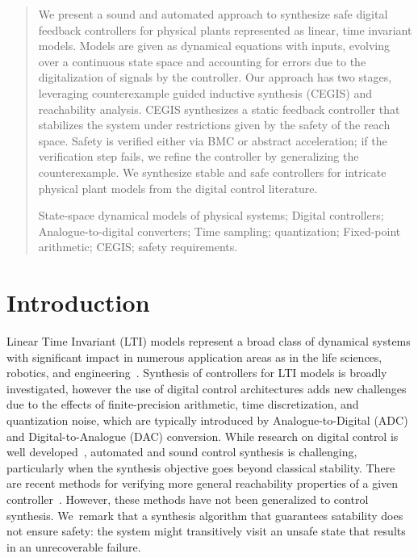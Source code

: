 \documentclass[runningheads,a4paper]{llncs}
\newcommand{\keywords}[1]{\par\addvspace\baselineskip
\noindent\keywordname\enspace\ignorespaces#1}
\begin{document}
\institute{}

\maketitle


\begin{abstract}
%
We present a sound and automated approach to synthesize safe digital
feedback controllers for physical plants represented as linear, time
invariant models.  Models are given as dynamical equations with inputs,
evolving over a continuous state space and accounting for errors due to the
digitalization of signals by the controller.  Our approach has two stages,
leveraging counterexample guided inductive synthesis (CEGIS) and
reachability analysis.  CEGIS synthesizes a static feedback controller that
stabilizes the system under restrictions given by the safety of the reach
space.  Safety is verified either via BMC or abstract acceleration; if the
verification step fails, we refine the controller by generalizing the
counterexample.  We synthesize stable and safe controllers for intricate
physical plant models from the digital control literature.
%
\keywords{
State-space dynamical models of physical systems; 
Digital controllers; 
Analogue-to-digital converters; 
Time sampling; 
quantization; 
Fixed-point arithmetic; 
CEGIS; 
safety requirements. 
}
\end{abstract}


\section{Introduction}

Linear Time Invariant (LTI) models represent a broad class of dynamical
systems with significant impact in numerous application areas as in the life
sciences, robotics, and engineering~\cite{astrom1997computer,Franklin15}. 
Synthesis of controllers for LTI models is broadly investigated, however the
use of digital control architectures adds new challenges due to the effects
of finite-precision arithmetic, time discretization, and quantization noise,
which are typically introduced by Analogue-to-Digital (ADC) and
Digital-to-Analogue (DAC) conversion.  While research on digital control is
well developed~\cite{astrom1997computer}, automated and sound control
synthesis is challenging, particularly when the synthesis objective goes
beyond classical stability.  There are recent methods for verifying more
general reachability properties of a given controller~\cite{FLD+11,Fre05}. 
However, these methods have not been generalized to control synthesis. 
We~remark that a synthesis algorithm that guarantees satability does not
ensure safety: the system might transitively visit an unsafe state that
results in an unrecoverable failure.
\end{document}
